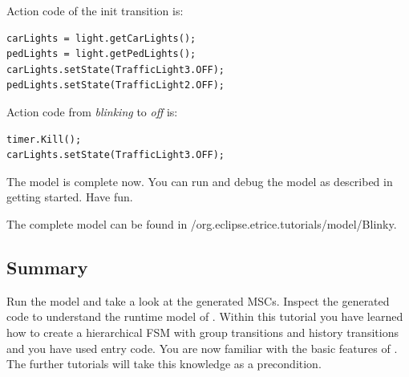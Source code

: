 Action code of the init transition is:

\begin{verbatim}
carLights = light.getCarLights();
pedLights = light.getPedLights();
carLights.setState(TrafficLight3.OFF);
pedLights.setState(TrafficLight2.OFF);
\end{verbatim}

Action code from \textit{blinking} to \textit{off} is:

\begin{verbatim}
timer.Kill();
carLights.setState(TrafficLight3.OFF); 
\end{verbatim}

The model is complete now. You can run and debug the model as described in getting started. Have fun.

The complete model can be found in /org.eclipse.etrice.tutorials/model/Blinky.

\subsection{Summary}

Run the model and take a look at the generated MSCs. Inspect the generated code to understand the runtime 
model of \eTrice{}. Within this tutorial you have learned how to create a hierarchical FSM with group 
transitions and history transitions and you have used entry code. You are now familiar with the basic 
features of \eTrice{}. The further tutorials will take this knowledge as a precondition.
